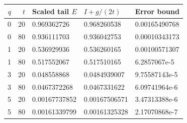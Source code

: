\begin{tabular}{rrlll}
\toprule
$q$ & $t$ & Scaled tail $E$ & $I+g/(2t)$ & Error bound \\
\midrule
0 & 20 & 0.969362726 & 0.968260538 & 0.00165490768 \\
0 & 80 & 0.936111703 & 0.936042753 & 0.00010343173 \\
1 & 20 & 0.536929936 & 0.536260165 & 0.00100571307 \\
1 & 80 & 0.517552067 & 0.517510165 & 6.2857067e-5 \\
3 & 20 & 0.048558868 & 0.0484939007 & 9.75587143e-5 \\
3 & 80 & 0.0467372268 & 0.0467331622 & 6.09741964e-6 \\
5 & 20 & 0.00167737852 & 0.00167506571 & 3.47313388e-6 \\
5 & 80 & 0.00161339799 & 0.00161325328 & 2.17070868e-7 \\
\bottomrule
\end{tabular}
